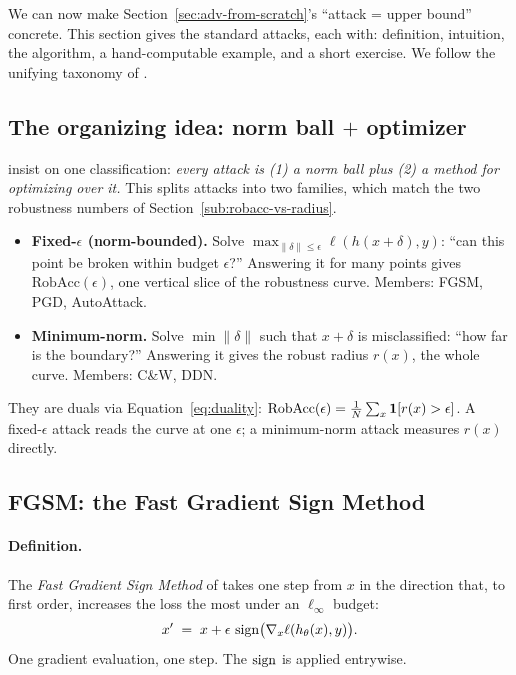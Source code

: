 We can now make Section~\ref{sec:adv-from-scratch}'s ``attack = upper bound'' concrete. This section gives the standard attacks, each with: definition, intuition, the algorithm, a hand-computable example, and a short exercise. We follow the unifying taxonomy of \citet{kolter2018adversarial,madry2018towards}.

\subsection{The organizing idea: norm ball $+$ optimizer}
\label{sub:taxonomy}

\citet{kolter2018adversarial} insist on one classification: \emph{every attack is (1) a norm ball plus (2) a method for optimizing over it.} This splits attacks into two families, which match the two robustness numbers of Section~\ref{sub:robacc-vs-radius}.
\begin{itemize}[nosep]
  \item \textbf{Fixed-$\epsilon$ (norm-bounded).} Solve $\max_{\|\delta\|\le\epsilon}\ell(h(x+\delta),y)$: ``can this point be broken within budget $\epsilon$?'' Answering it for many points gives $\mathrm{RobAcc}(\epsilon)$, one vertical slice of the robustness curve. Members: FGSM, PGD, AutoAttack.
  \item \textbf{Minimum-norm.} Solve $\min\|\delta\|$ such that $x+\delta$ is misclassified: ``how far is the boundary?'' Answering it gives the robust radius $r(x)$, the whole curve. Members: C\&W, DDN.
\end{itemize}
They are duals via Equation~\eqref{eq:duality}: $\mathrm{RobAcc}(\epsilon)=\tfrac1N\sum_x\mathbf 1[r(x)>\epsilon]$. A fixed-$\epsilon$ attack reads the curve at one $\epsilon$; a minimum-norm attack measures $r(x)$ directly.

\subsection{FGSM: the Fast Gradient Sign Method}
\label{sub:fgsm}

\paragraph{Definition.} The \emph{Fast Gradient Sign Method} of \citet{goodfellow2015explaining} takes one step from $x$ in the direction that, to first order, increases the loss the most under an $\ell_\infty$ budget:
\begin{equation}
  \label{eq:fgsm}
  x' \;=\; x + \epsilon\,\operatorname{sign}\!\big(\nabla_x \ell(h_\theta(x),y)\big).
\end{equation}
One gradient evaluation, one step. The $\operatorname{sign}$ is applied entrywise.

